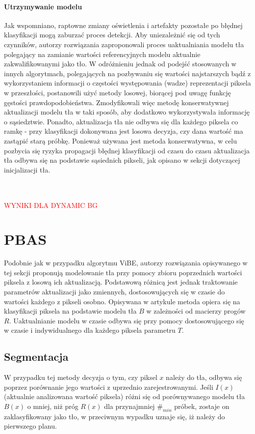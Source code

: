 \paragraph{Utrzymywanie modelu \\}
Jak wspomniano, raptowne zmiany oświetlenia i artefakty pozostałe po błędnej klasyfikacji mogą zaburzać proces detekcji. Aby uniezależnić się od tych czynników, autorzy rozwiązania zaproponowali proces uaktualniania modelu tła polegający na zamianie wartości referencyjnych modelu aktualnie zakwalifikowanymi jako tło. W odróżnieniu jednak od podejść stosowanych w innych algorytmach, polegających na pozbywaniu się wartości najstarszych bądź z wykorzystaniem informacji o częstości występowania (wadze) reprezentacji piksela w przeszłości, postanowili użyć metody losowej, biorącej pod uwagę funkcję gęstości prawdopodobieństwa. Zmodyfikowali więc metodę konserwatywnej aktualizacji modelu tła w taki sposób, aby dodatkowo wykorzystywała informację o sąsiedztwie. Ponadto, aktualizacja tła nie odbywa się dla każdego piksela co ramkę - przy klasyfikacji dokonywana jest losowa decyzja, czy dana wartość ma zastąpić starą próbkę. Ponieważ używana jest metoda konserwatywna, w celu pozbycia się ryzyka propagacji błędnej klasyfikacji od czasu do czasu aktualizacja tła odbywa się na podstawie sąsiednich pikseli, jak opisano w sekcji dotyczącej inicjalizacji tła.\\ \\ \\
\begin{LARGE}
\textcolor{red}{WYNIKI DLA DYNAMIC BG}
\end{LARGE}
\section{PBAS}
Podobnie jak w przypadku algorytmu ViBE, autorzy rozwiązania opisywanego w tej sekcji proponują modelowanie tła przy pomocy zbioru poprzednich wartości piksela z losową ich aktualizacją. Podstawową różnicą jest jednak traktowanie parametrów aktualizacji jako zmiennych, dostosowujących się w czasie do wartości każdego z pikseli osobno. Opisywana w artykule \cite{hofmann2012background} metoda opiera się na klasyfikacji piksela na podstawie modelu tła $B$ w zależności od macierzy progów $R$. Uaktualnianie modelu w czasie odbywa się przy pomocy dostosowującego się w czasie i indywidualnego dla każdego piksela parametru $T$.
\subsection{Segmentacja}
W przypadku tej metody decyzja o tym, czy piksel $x$ należy do tła, odbywa się poprzez porównanie jego wartości z uprzednio zarejestrowanymi. Jeśli $I(x)$ (aktualnie analizowana wartość piksela) różni się od porównywanego modelu tła $B(x)$ o mniej, niż próg $R(x)$ dla przynajmniej $\#_{min}$ próbek, zostaje on zaklasyfikowany jako tło, w przeciwnym wypadku uznaje się, iż należy do pierwszego planu.
